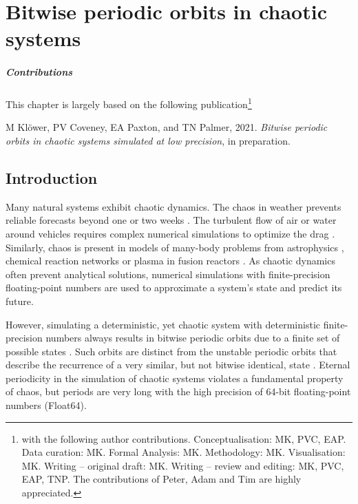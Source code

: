 \chapter{Bitwise periodic orbits in chaotic systems}
\label{chap:orbits}

\small \paragraph{Contributions} This chapter is largely based on the following publication\footnote{with the following author contributions.
Conceptualisation: MK, PVC, EAP. Data curation: MK. Formal Analysis: MK. Methodology: MK. Visualisation: MK. Writing – original draft:
MK. Writing – review and editing: MK, PVC, EAP, TNP. The contributions of Peter, Adam and Tim are highly appreciated.}

\vspace{\baselineskip}
\indent M Klöwer, PV Coveney, EA Paxton, and TN Palmer, 2021.
\emph{Bitwise periodic orbits in chaotic systems simulated at low precision}, in preparation.
\vspace{\baselineskip}
\normalsize

\section{Introduction}

Many natural systems exhibit chaotic dynamics. The chaos in weather prevents reliable forecasts beyond
one or two weeks \citep{Bauer2015,Palmer2019}. The turbulent flow of air or water around vehicles requires
complex numerical simulations to optimize the drag \citep{Cummings2015,Moran2003}. Similarly, chaos is present
in models of many-body problems from astrophysics \citep{Cornish2001,Springel2005}, chemical reaction networks
\citep{Coveney2016} or plasma in fusion reactors
\citep{DIppolito2011,Ricci2012,ITERPhysicsExpertGrouponConfinementandTransport1999}. As chaotic dynamics often
prevent analytical solutions, numerical simulations with finite-precision floating-point numbers \citep{IEEE1985}
are used to approximate a system’s state and predict its future.

However, simulating a deterministic, yet chaotic system with deterministic finite-precision numbers always results in
bitwise periodic orbits due to a finite set of possible states \citep{Boghosian2019}. Such orbits are distinct from the
unstable periodic orbits that describe the recurrence of a very similar, but not bitwise identical, state \cite{Cvitanović2013}.
Eternal periodicity in the simulation of chaotic systems violates a fundamental property of chaos, but periods are very
long with the high precision of 64-bit floating-point numbers (Float64).

